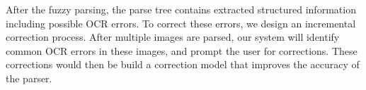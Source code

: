 After the fuzzy parsing, the parse tree contains extracted structured 
information including possible OCR errors. To correct these errors, 
we design an incremental correction process. 
After multiple images are parsed, our system will identify common OCR errors 
in these images, and prompt the user for corrections. 
These corrections would then be build a correction model that improves
the accuracy of the parser.






